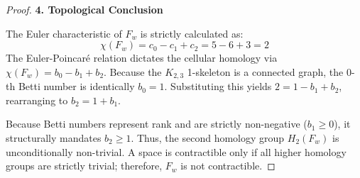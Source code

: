 \documentclass[12pt]{article}
\begin{document}
\begin{proof}
\vspace{1em}
\noindent\textbf{4. Topological Conclusion}

The Euler characteristic of $F_w$ is strictly calculated as:
\[
\chi(F_w) = c_0 - c_1 + c_2 = 5 - 6 + 3 = 2
\]
The Euler-Poincaré relation dictates the cellular homology via $\chi(F_w) = b_0 - b_1 + b_2$. Because the $K_{2,3}$ 1-skeleton is a connected graph, the 0-th Betti number is identically $b_0 = 1$. Substituting this yields $2 = 1 - b_1 + b_2$, rearranging to $b_2 = 1 + b_1$. 

Because Betti numbers represent rank and are strictly non-negative ($b_1 \geq 0$), it structurally mandates $b_2 \geq 1$. Thus, the second homology group $H_2(F_w)$ is unconditionally non-trivial. A space is contractible only if all higher homology groups are strictly trivial; therefore, $F_w$ is not contractible.
\end{proof}
\end{document}
